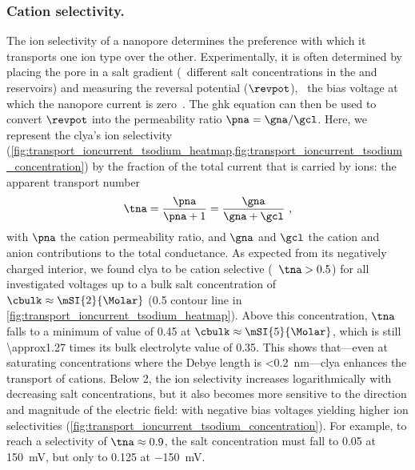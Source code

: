 \subsubsection{Cation selectivity.}
%
The ion selectivity of a nanopore determines the preference with which it transports one ion type over the
other. Experimentally, it is often determined by placing the pore in a salt gradient (\ie~different salt
concentrations in the \cisi{} and \transi{} reservoirs) and measuring the reversal potential ($\revpot$),
\ie~the bias voltage at which the nanopore current is zero~\cite{Soskine-2013,Franceschini-2016}. The
\gls{ghk} equation can then be used to convert $\revpot$ into the permeability ratio $\pna = \gna / \gcl$.
Here, we represent the \gls{clya}'s ion selectivity
%
(\cref{fig:transport_ioncurrent_tsodium_heatmap,fig:transport_ioncurrent_tsodium_concentration}) 
%
by the fraction of the total current that is carried by \Na{} ions: the apparent \Na{} transport number
%
\begin{align}\label{eq:tna}
  \tna = \dfrac{\pna}{\pna + 1} = \dfrac{\gna}{\gna + \gcl}
  \text{ ,}
\end{align}
%
with $\pna$ the cation permeability ratio, and $\gna$ and $\gcl$ the cation and anion contributions to the
total conductance. As expected from its negatively charged interior, we found \gls{clya} to be cation
selective (\ie~$\tna > 0.5$) for all investigated voltages up to a bulk salt concentration of $\cbulk \approx
\mSI{2}{\Molar}$  (0.5 contour line in \cref{fig:transport_ioncurrent_tsodium_heatmap}). Above this
concentration, $\tna$ falls to a minimum of value of 0.45 at $\cbulk\approx\mSI{5}{\Molar}$, which is still
\num{\approx1.27} times its bulk electrolyte value of 0.35. This shows that---even at saturating
concentrations where the Debye length is \SI{<0.2}{\nm}---\gls{clya} enhances the transport of cations. Below
\SI{2}{\Molar}, the ion selectivity increases logarithmically with decreasing salt concentrations, but it also
becomes more sensitive to the direction and magnitude of the electric field:  with negative bias voltages
yielding higher ion selectivities (\cref{fig:transport_ioncurrent_tsodium_concentration}). For example, to
reach a selectivity of $\tna \approx 0.9$, the salt concentration must fall to \SI{0.05}{\Molar} at
\SI{+150}{\mV}, but only to \SI{0.125}{\Molar} at \SI{-150}{\mV}.

